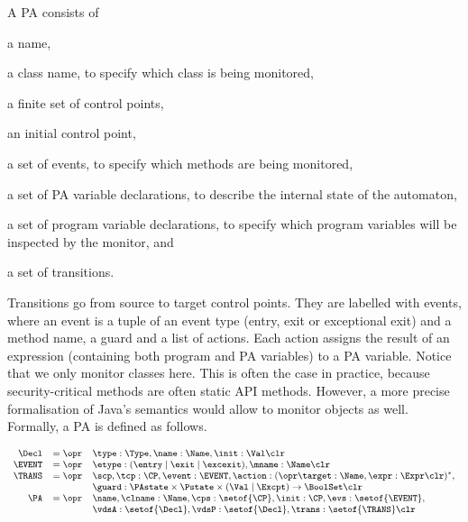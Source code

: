 A PA consists of
\begin{inparaenum}
\item a name,
\item a class name, to specify which class is being monitored,
\item a finite set of control points,
\item an initial control point,
\item a set of events, to specify which methods are being monitored,
\item a set of PA variable declarations, to describe
the internal state of the automaton,
\item a set of program variable declarations, to specify which
program variables will be inspected by the monitor, and
\item a set of transitions.
\end{inparaenum}
Transitions go from source to target control points. They are labelled
with events, where an event is a tuple of an event type (entry, exit
or exceptional exit) and a method name, a guard and a list of
actions. Each action assigns the result of an expression (containing
both program and PA variables) to a PA
variable. Notice that we only monitor classes here. This is often
the case in practice, because security-critical methods are often
static API methods. However, a more precise formalisation of Java's semantics
would allow to monitor objects as well. Formally, a PA is defined as follows.

\vspace*{-1em}
\[{\small
\begin{array}{rcl}
\Decl & = \opr & \type : \Type, \name : \Name, \init : \Val
\clr \\
\EVENT & = \opr & \etype : (\entry \mid \exit \mid \excexit),
                 \mname : \Name \clr\\
\TRANS & = \opr & \scp, \tcp : \CP, \event : \EVENT, \action : (\opr \target : \Name, \expr : \Expr \clr)^*, \\
& &
\guard : \PAstate \times \Pstate \times (\Val \mid \Excpt) \rightarrow \BoolSet\clr\\
\PA & = \opr & \name, \clname : \Name, \cps : \setof{\CP},
            \init : \CP, \evs : \setof{\EVENT},\\
     &   &  \vdsA : \setof{\Decl}, \vdsP : \setof{\Decl},
            \trans : \setof{\TRANS} \clr
\end{array}}
\]

